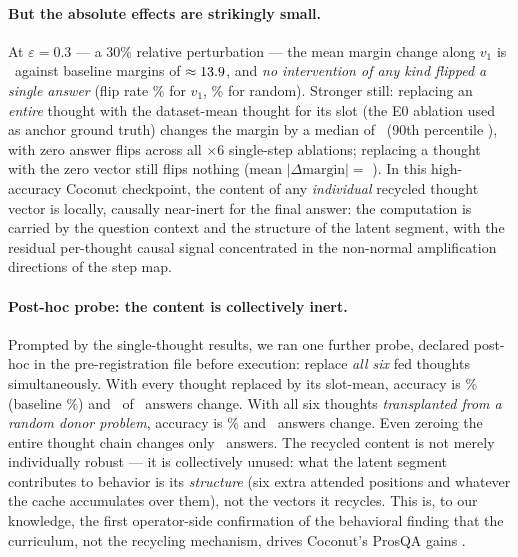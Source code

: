 \documentclass[11pt]{article}
\begin{document}
\paragraph{But the absolute effects are strikingly small.} At $\varepsilon=0.3$ ---
a 30\% relative perturbation --- the mean margin change along $v_1$ is
\eOneVoneMeanHi\ against baseline margins of $\approx13.9$, and
\emph{no intervention of any kind flipped a single answer}
(flip rate \eOneFlipVoneHiPct\% for $v_1$, \eOneFlipRandHiPct\% for random).
Stronger still: replacing an \emph{entire} thought with the dataset-mean thought
for its slot (the E0 ablation used as anchor ground truth) changes the margin by a
median of \ablMedian\ (90th percentile \ablPNinety), with zero answer flips across
all \nTestProblems$\times$6 single-step ablations; replacing a thought with the
zero vector still flips nothing (mean $|\Delta\text{margin}|=$ \ablZeroMean). In
this high-accuracy Coconut checkpoint, the content of any \emph{individual}
recycled thought vector is locally, causally near-inert for the final answer: the
computation is carried by the question context and the structure of the latent
segment, with the residual per-thought causal signal concentrated in the
non-normal amplification directions of the step map.

\paragraph{Post-hoc probe: the content is collectively inert.} Prompted by the
single-thought results, we ran one further probe, declared post-hoc in the
pre-registration file before execution: replace \emph{all six} fed thoughts
simultaneously. With every thought replaced by its slot-mean, accuracy is
\posthocAllMeanAccPct\% (baseline \posthocBaseAccPct\%) and \posthocAllMeanChanged\
of \nTestProblems\ answers change. With all six thoughts \emph{transplanted from a
random donor problem}, accuracy is \posthocAllDonorAccPct\% and
\posthocAllDonorChanged\ answers change. Even zeroing the entire thought chain
changes only \posthocAllZeroChanged\ answers. The recycled content is not merely
individually robust --- it is collectively unused: what the latent segment
contributes to behavior is its \emph{structure} (six extra attended positions and
whatever the cache accumulates over them), not the vectors it recycles. This is,
to our knowledge, the first operator-side confirmation of the behavioral finding
that the curriculum, not the recycling mechanism, drives Coconut's ProsQA gains
\citep{martin2026curriculum}.
\end{document}
